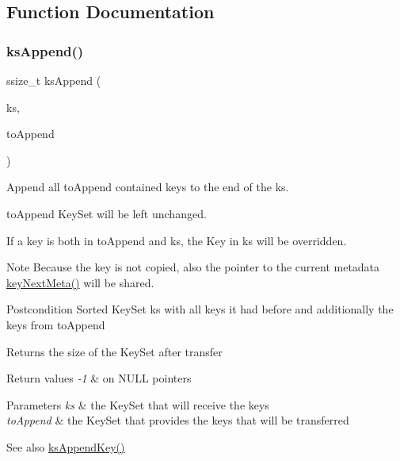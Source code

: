 \subsection{Function Documentation}
\mbox{\label{group__keyset_ga21eb9c3a14a604ee3a8bdc779232e7b7}} 
\subsubsection{\texorpdfstring{ksAppend()}{ksAppend()}}
{\footnotesize\ttfamily ssize\+\_\+t ks\+Append (\begin{DoxyParamCaption}\item[{Key\+Set $\ast$}]{ks,  }\item[{const Key\+Set $\ast$}]{to\+Append }\end{DoxyParamCaption})}



Append all {\ttfamily to\+Append} contained keys to the end of the {\ttfamily ks}. 

{\ttfamily to\+Append} Key\+Set will be left unchanged.

If a key is both in to\+Append and ks, the Key in ks will be overridden.

\begin{DoxyNote}{Note}
Because the key is not copied, also the pointer to the current metadata \mbox{\hyperlink{group__keymeta_ga4c88342f580a4291455a801af71ce048}{key\+Next\+Meta()}} will be shared.
\end{DoxyNote}
\begin{DoxyPostcond}{Postcondition}
Sorted Key\+Set ks with all keys it had before and additionally the keys from to\+Append 
\end{DoxyPostcond}
\begin{DoxyReturn}{Returns}
the size of the Key\+Set after transfer 
\end{DoxyReturn}

\begin{DoxyRetVals}{Return values}
{\em -\/1} & on N\+U\+LL pointers \\
\hline
\end{DoxyRetVals}

\begin{DoxyParams}{Parameters}
{\em ks} & the Key\+Set that will receive the keys \\
\hline
{\em to\+Append} & the Key\+Set that provides the keys that will be transferred \\
\hline
\end{DoxyParams}
\begin{DoxySeeAlso}{See also}
\mbox{\hyperlink{group__keyset_gaa5a1d467a4d71041edce68ea7748ce45}{ks\+Append\+Key()}} 
\end{DoxySeeAlso}
\mbox{\label{group__keyset_gaa5a1d467a4d71041edce68ea7748ce45}} 
